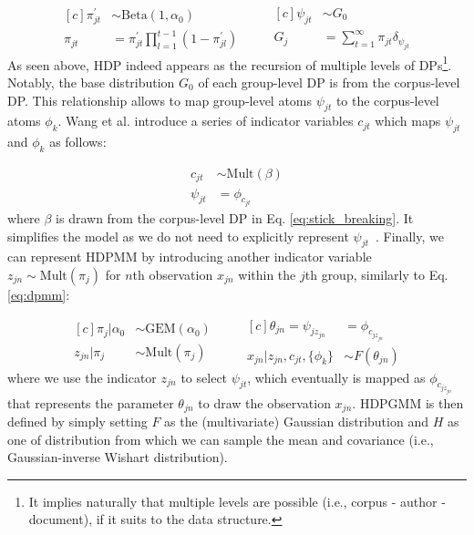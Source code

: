 \documentclass{article}
\begin{document}
\begin{equation}\label{eq:hdp_doc_level}
\begin{aligned}[c]
    \pi^{\prime}_{jt} &\sim \text{Beta}(1, \alpha_{0}) \\
    \pi_{jt} &= \pi^{\prime}_{jt} \prod^{t - 1}_{l = 1} (1 - \pi^{\prime}_{jl})
\end{aligned}
\qquad
\begin{aligned}[c]
    \psi_{jt} &\sim G_{0} \\
    G_{j} &= \sum^{\infty}_{t = 1} \pi_{jt}\delta_{\psi_{jt}}
\end{aligned}
\end{equation}
As seen above, HDP indeed appears as the recursion of multiple levels of DPs\footnote{It implies naturally that multiple levels are possible (i.e., corpus - author - document), if it suits to the data structure.}. Notably, the base distribution $G_{0}$ of each group-level DP is from the corpus-level DP. This relationship allows to map group-level atoms $\psi_{jt}$ to the corpus-level atoms $\phi_{k}$. Wang et al. introduce a series of indicator variables $c_{jt}$ which maps $\psi_{jt}$ and $\phi_{k}$ as follows\cite{DBLP:journals/jmlr/WangPB11}:


\begin{equation}\label{eq:psi2phi}
\begin{aligned}
    c_{jt} &\sim \text{Mult}(\beta) \\
    \psi_{jt} &= \phi_{c_{jt}}
\end{aligned}
\end{equation}
where $\beta$ is drawn from the corpus-level DP in Eq. \ref{eq:stick_breaking}. It simplifies the model as we do not need to explicitly represent $\psi_{jt}$~\cite{DBLP:journals/jmlr/WangPB11}.
Finally, we can represent HDPMM by introducing another indicator variable $z_{jn} \sim \text{Mult}(\pi_{j})$ for $n$th observation $x_{jn}$ within the $j$th group, similarly to Eq. \ref{eq:dpmm}:


\begin{equation}\label{eq:hdpmm}
\begin{aligned}[c]
    \pi_{j}|\alpha_{0} &\sim \text{GEM}(\alpha_{0}) \\
    z_{jn}|\pi_{j} &\sim \text{Mult}(\pi_{j})
\end{aligned}
\qquad
\begin{aligned}[c]
    \theta_{jn} = \psi_{jz_{jn}} &= \phi_{c_{jz_{jn}}}  \\
    x_{jn}|z_{jn}, c_{jt}, \{\phi_{k}\} &\sim F(\theta_{jn}) 
\end{aligned}
\end{equation}
where we use the indicator $z_{jn}$ to select $\psi_{jt}$, which eventually is mapped as $\phi_{c_{jz_{jn}}}$ that represents the parameter $\theta_{jn}$ to draw the observation $x_{jn}$. HDPGMM is then defined by simply setting $F$ as the (multivariate) Gaussian distribution and $H$ as one of distribution from which we can sample the mean and covariance (i.e., Gaussian-inverse Wishart distribution).
\end{document}
